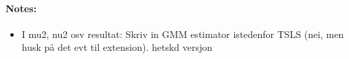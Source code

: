 

\paragraph{Notes:}
\begin{itemize}
    \item 
        I mu2, nu2 osv resultat: Skriv in GMM estimator istedenfor TSLS (nei, men husk på det evt til extension). hetskd versjon
\end{itemize}

